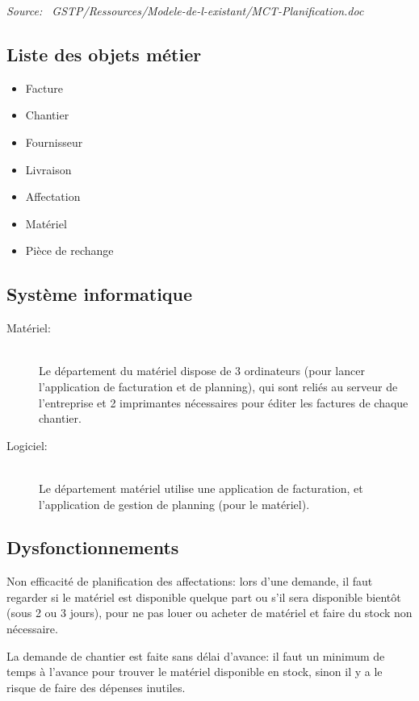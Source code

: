\documentclass[twoside]{article}
\newcommand\el{\hfill\\}
\begin{document}
    {\sl Source:~{\ttfamily 
        GSTP/Ressources/Modele-de-l-existant/MCT-Planification.doc}}


\subsection{Liste des objets métier}

    \begin{itemize}
    	\item Facture
    	\item Chantier
    	\item Fournisseur
    	\item Livraison
    	\item Affectation
    	\item Matériel
    	\item Pièce de rechange
    \end{itemize}

\subsection{Système informatique}

    \begin{description}
        \item [Matériel:]\el 
            Le département du matériel dispose de 3 ordinateurs (pour lancer
            l'application de facturation et de planning), qui sont reliés au
            serveur de l'entreprise et 2 imprimantes nécessaires pour
            éditer les factures de chaque chantier.

        \item [Logiciel:]\el
            Le département matériel utilise une application de facturation,
            et l'application de gestion de planning (pour le matériel).
    \end{description}

\subsection{Dysfonctionnements}

    Non efficacité de planification des affectations: lors d'une demande,
    il faut regarder si le matériel est disponible quelque part ou s'il sera
    disponible bientôt (sous 2 ou 3 jours), pour ne pas louer ou acheter de
    matériel et faire du stock non nécessaire.

    La demande de chantier est faite sans délai d'avance: il faut un minimum
    de temps à l'avance pour trouver le matériel disponible en stock, sinon
    il y a le risque de faire des dépenses inutiles.
\end{document}
